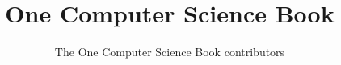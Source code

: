\documentclass[11pt,a4paper,twoside,openany]{book}
\title{One Computer Science Book}
\author{The One Computer Science Book contributors}
\date{\bookdate}
\begin{document}
\frontmatter




\tableofcontents

\mainmatter





\appendix
\part{\omsolutionspart}




\backmatter
\renewcommand{\indexspace}{\par\vskip 8pt plus 4pt minus 4pt\relax}
\printindex
\end{document}

